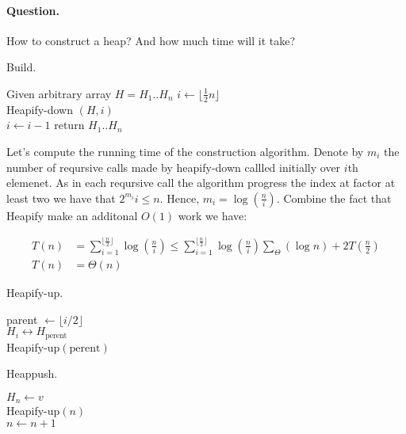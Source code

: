 \paragraph{Question.} How to construct a heap? And how much time will it take?   
\begin{algbox}{Build.}
\begin{algorithm}[H]
  Given arbitrary array $ H = H_{1} .. H_{n} $  
  $ i \leftarrow \lfloor \frac{1}{2}n  \rfloor $ \\
  { 
    Heapify-down $\left( H, i \right)$ \\ 
    $ i \leftarrow i - 1 $  
  }
return $H_{1} .. H_{n}$
\end{algorithm}
\end{algbox}

Let's compute the running time of the construction algorithm.  Denote by $m_i$ the number of reqursive calls made by heapify-down callled initially over $i$th elemenet. As in each reqursive call the algorithm progress the index at factor at least two we have that  $2^{m_i} i \le n$. Hence, $m_{i} = \log\left( \frac{n}{i} \right)$. Combine the fact that Heapify make an additonal $O(1)$ work we have:

\begin{equation*}
  \begin{split}
    T\left( n \right) &= \sum_{i=1}^{\lfloor \frac{n}{2} \rfloor}{  \log\left( \frac{n}{i} \right) } \le  \sum_{i=1}^{\lfloor \frac{n}{2} \rfloor}{  \log\left( \frac{n}{i} \right) }   \sum_\Theta \left( \log n \right) + 2T\left( \frac{n}{2} \right) \\ 
    T\left( n \right) &= \Theta\left(  n  \right) 
  \end{split}
\end{equation*}

\begin{algbox}{Heapify-up.}
\begin{algorithm}[H]
parent $\leftarrow \lfloor i/2 \rfloor $ \\
 { 
  $ H_{i} \leftrightarrow H_{\text{perent}} $ \\ 
  Heapify-up$\left( \text{perent}  \right)$
}
\end{algorithm}
\end{algbox}



\begin{algbox}{Heappush.}
\begin{algorithm}[H]
$ H_{n} \leftarrow v $ \\ 
Heapify-up$\left( n \right)$\\
$ n \leftarrow n + 1 $ 
\end{algorithm}
\end{algbox}


